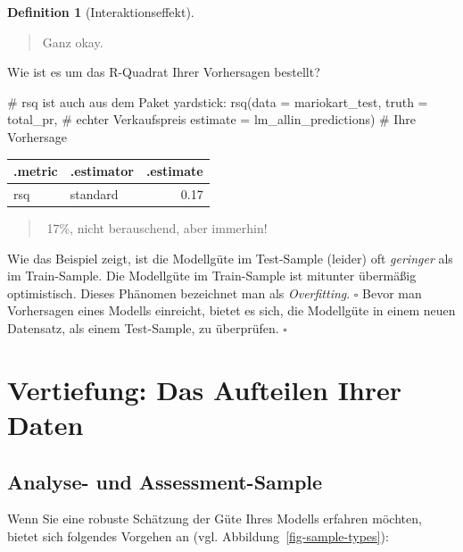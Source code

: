 \documentclass[
  letterpaper,
]{scrbook}
\newenvironment{Shaded}{\begin{snugshade}}{\end{snugshade}}
\newcommand{\AttributeTok}[1]{\textcolor[rgb]{0.40,0.45,0.13}{#1}}
\newcommand{\CommentTok}[1]{\textcolor[rgb]{0.37,0.37,0.37}{#1}}
\newcommand{\FunctionTok}[1]{\textcolor[rgb]{0.28,0.35,0.67}{#1}}
\newcommand{\NormalTok}[1]{\textcolor[rgb]{0.00,0.23,0.31}{#1}}
\theoremstyle{definition}
\theoremstyle{definition}
\theoremstyle{definition}
\newtheorem{definition}{Definition}[chapter]
\theoremstyle{remark}
\begin{document}
\begin{definition}[Interaktionseffekt]
\begin{quote}
{} Ganz okay.
\end{quote}

Wie ist es um das R-Quadrat Ihrer Vorhersagen bestellt?

\begin{Shaded}
\begin{Highlighting}[]
\CommentTok{\# \textasciigrave{}rsq \textasciigrave{} ist auch aus dem Paket yardstick:}
\FunctionTok{rsq}\NormalTok{(}\AttributeTok{data =}\NormalTok{ mariokart\_test,}
    \AttributeTok{truth =}\NormalTok{ total\_pr,  }\CommentTok{\# echter Verkaufspreis}
    \AttributeTok{estimate =}\NormalTok{ lm\_allin\_predictions)  }\CommentTok{\# Ihre Vorhersage}
\end{Highlighting}
\end{Shaded}

\begin{longtable}[]{@{}llr@{}}
\toprule\noalign{}
.metric & .estimator & .estimate \\
\midrule\noalign{}
\endhead
\bottomrule\noalign{}
\endlastfoot
rsq & standard & 0.17 \\
\end{longtable}

\begin{quote}
{}️ 17\%, nicht berauschend, aber immerhin!
\end{quote}

Wie das Beispiel zeigt, ist die Modellgüte im Test-Sample (leider) oft
\emph{geringer} als im Train-Sample. Die Modellgüte im Train-Sample ist
mitunter übermäßig optimistisch. Dieses Phänomen bezeichnet man als
\emph{Overfitting}. \(\square\) Bevor man Vorhersagen eines Modells
einreicht, bietet es sich, die Modellgüte in einem neuen Datensatz, als
einem Test-Sample, zu überprüfen. \(\square\)

\section{Vertiefung: Das Aufteilen Ihrer
Daten}\label{vertiefung-das-aufteilen-ihrer-daten}

\subsection{Analyse- und
Assessment-Sample}\label{analyse--und-assessment-sample}

Wenn Sie eine robuste Schätzung der Güte Ihres Modells erfahren möchten,
bietet sich folgendes Vorgehen an (vgl.
Abbildung~\ref{fig-sample-types}):


\end{definition}
\end{document}
